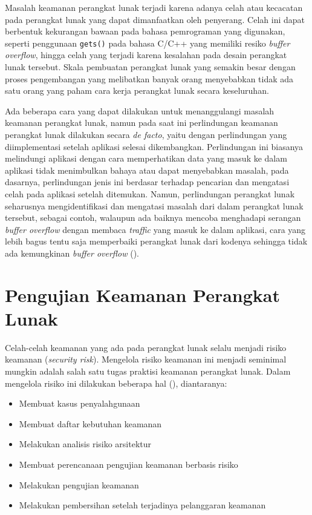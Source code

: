 Masalah keamanan perangkat lunak terjadi karena adanya celah atau kecacatan pada perangkat lunak yang dapat
dimanfaatkan oleh penyerang. Celah ini dapat berbentuk kekurangan bawaan pada bahasa pemrograman yang digunakan,
seperti penggunaan \texttt{gets()} pada bahasa C/C++ yang memiliki resiko \emph{buffer overflow},
hingga celah yang terjadi
karena kesalahan pada desain perangkat lunak tersebut. Skala pembuatan perangkat lunak yang semakin besar
dengan proses pengembangan yang melibatkan banyak orang menyebabkan tidak ada satu orang yang paham
cara kerja perangkat lunak secara keseluruhan.

Ada beberapa cara yang dapat dilakukan untuk menanggulangi masalah keamanan perangkat lunak,
namun pada saat ini perlindungan keamanan perangkat lunak dilakukan secara \emph{de facto},
yaitu dengan perlindungan yang diimplementasi setelah aplikasi selesai dikembangkan.
Perlindungan ini biasanya melindungi aplikasi dengan cara memperhatikan data yang masuk
ke dalam aplikasi tidak menimbulkan bahaya atau dapat menyebabkan masalah, pada dasarnya,
perlindungan jenis ini berdasar terhadap pencarian dan mengatasi celah pada aplikasi setelah ditemukan.
Namun, perlindungan perangkat lunak seharusnya mengidentifikasi dan mengatasi masalah dari
dalam perangkat lunak tersebut, sebagai contoh, walaupun ada baiknya mencoba menghadapi serangan
\emph{buffer overflow} dengan membaca \emph{traffic} yang masuk ke dalam aplikasi,
cara yang lebih bagus tentu saja memperbaiki perangkat lunak dari kodenya sehingga
tidak ada kemungkinan \emph{buffer overflow} (\cite{grawsec}).



\section{Pengujian Keamanan Perangkat Lunak}

Celah-celah keamanan yang ada pada perangkat lunak selalu menjadi risiko keamanan (\emph{security risk}).
Mengelola risiko keamanan ini menjadi seminimal mungkin adalah salah satu tugas praktisi keamanan perangkat lunak.
Dalam mengelola risiko ini dilakukan beberapa hal (\cite{grawsectest}), diantaranya:

\begin{itemize}
    \item Membuat kasus penyalahgunaan
    \item Membuat daftar kebutuhan keamanan
    \item Melakukan analisis risiko arsitektur
    \item Membuat perencanaan pengujian keamanan berbasis risiko
    \item Melakukan pengujian keamanan
    \item Melakukan pembersihan setelah terjadinya pelanggaran keamanan
\end{itemize}

